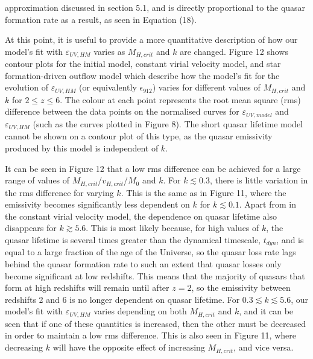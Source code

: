 \documentclass[12pt]{article}%
\begin{document}
\noindent approximation discussed in section 5.1, and is directly proportional to the quasar formation rate as a result, as seen in Equation (18).\par

At this point, it is useful to provide a more quantitative description of how our model's fit with $\varepsilon_{UV,HM}$ varies as $M_{H,crit}$ and $k$ are chang\-ed. Figure 12 shows contour plots for the initial model, constant virial velocity model, and star formation-driven outflow model which describe how the model's fit for the evolution of $\varepsilon_{UV,HM}$ (or equivalently $\epsilon_{912}$) varies for different values of $M_{H,crit}$ and $k$ for $2\leq z\leq6$. The colour at each point represents the root mean square (rms) difference between the data points on the normalised curves for $\varepsilon_{UV,model}$ and $\varepsilon_{UV,HM}$ (such as the curves plotted in Figure 8). The short quasar lifetime model cannot be shown on a contour plot of this type, as the quasar emissivity produced by this model is independent of $k$.\par

It can be seen in Figure 12 that a low rms difference can be achieved for a large range of values of $M_{H,crit}$/$v_{H,crit}$/$M_0$ and $k$. For $k\lesssim0.3$, there is little variation in the rms difference for varying $k$. This is the same as in Figure 11, where the emissivity becomes significantly less dependent on $k$ for $k\lesssim0.1$. Apart from in the constant virial velocity model, the dependence on quasar lifetime also disappears for $k\gtrsim5.6$. This is most likely because, for high values of $k$, the quasar lifetime is several times greater than the dynamical timescale, $t_{dyn}$, and is equal to a large fraction of the age of the Universe, so the quasar loss rate lags behind the quasar formation rate to such an extent that quasar losses only become significant at low redshifts. This means that the majority of quasars that form at high redshifts will remain until after $z=2$, so the emissivity between redshifts 2 and 6 is no longer dependent on quasar lifetime. For $0.3\lesssim k\lesssim5.6$, our model's fit with $\varepsilon_{UV,HM}$ varies depending on both $M_{H,crit}$ and $k$, and it can be seen that if one of these quantities is increased, then the other must be decreased in order to maintain a low rms difference. This is also seen in Figure 11, where decreasing $k$ will have the opposite effect of increasing $M_{H,crit}$, and vice versa.\par
\end{document}
